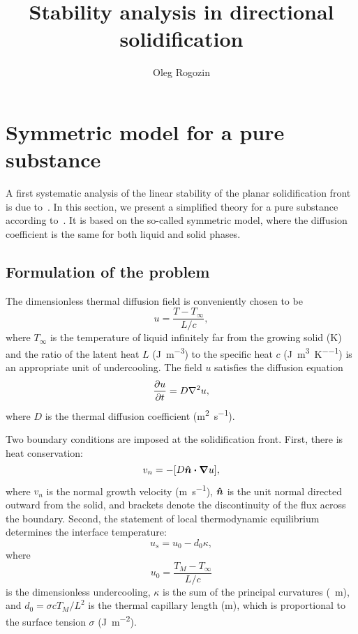 \documentclass{article}
\title{Stability analysis in directional solidification}
\author{Oleg Rogozin}
\newcommand{\bn}{\vu*{n}}
\begin{document}
\maketitle
\tableofcontents

\section{Symmetric model for a pure substance}

A first systematic analysis of the linear stability of the planar solidification front is due to~\textcite{mullins1964stability}.
In this section, we present a simplified theory for a pure substance according to~\textcite{langer1987lectures}.
It is based on the so-called symmetric model, where the diffusion coefficient is the same for both liquid and solid phases.

\subsection{Formulation of the problem}

The dimensionless thermal diffusion field is conveniently chosen to be
\begin{equation}\label{eq:u}
    u = \frac{T-T_\infty}{L/c},
\end{equation}
where $T_\infty$ is the temperature of liquid infinitely far from the growing solid (\si{\K})
and the ratio of the latent heat $L$ (\si{\J\per\m\cubed}) to the specific heat $c$ (\si{\J\per\m\cubed\per\K})
is an appropriate unit of undercooling.
The field $u$ satisfies the diffusion equation
\begin{equation}\label{eq:diffusion}
    \pdv{u}{t} = D\nabla^2u,
\end{equation}
where $D$ is the thermal diffusion coefficient (\si{\m\squared\per\s}).

Two boundary conditions are imposed at the solidification front.
First, there is heat conservation:
\begin{equation}\label{eq:bc1}
    v_n = -[D\bn\vdot\grad{u}],
\end{equation}
where $v_n$ is the normal growth velocity (\si{\m\per\s}),
$\bn$ is the unit normal directed outward from the solid,
and brackets denote the discontinuity of the flux across the boundary.
Second, the statement of local thermodynamic equilibrium determines the interface temperature:
\begin{equation}\label{eq:bc2}
    u_s = u_0 - d_0\kappa,
\end{equation}
where
\begin{equation}\label{eq:undercooling}
    u_0 = \frac{T_M - T_\infty}{L/c}
\end{equation}
is the dimensionless undercooling,
$\kappa$ is the sum of the principal curvatures (\si{\per\m}), and
$d_0 = \sigma c T_M/L^2$ is the thermal capillary length (\si{\m}),
which is proportional to the surface tension $\sigma$ (\si{\J\per\m\squared}).
\end{document}

